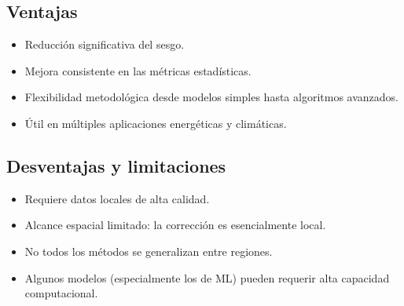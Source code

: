 \documentclass[letterpaper,12pt, twoside]{report}
\providecommand{\DIFdeltex}[1]{{\protect\color{red} \scriptsize #1}} %
\providecommand{\DIFdel}[1]{\texorpdfstring{\DIFdeltex{#1}}{}} %
\begin{document}
\subsection*{\DIFdel{Ventajas}}
\begin{itemize}%
\item%
\DIFdel{Reducción significativa del sesgo.
}%
\item%
\DIFdel{Mejora consistente en las métricas estadísticas.
}%
\item%
\DIFdel{Flexibilidad metodológica desde modelos simples hasta algoritmos avanzados.
}%
\item%
\DIFdel{Útil en múltiples aplicaciones energéticas y climáticas.
}
\end{itemize}%

\subsection*{\DIFdel{Desventajas y limitaciones}}

\begin{itemize}%
\item%
\DIFdel{Requiere datos locales de alta calidad.
}%
\item%
\DIFdel{Alcance espacial limitado: la corrección es esencialmente local.
}%
\item%
\DIFdel{No todos los métodos se generalizan entre regiones.
}%
\item%
\DIFdel{Algunos modelos (especialmente los de ML) pueden requerir alta capacidad computacional.
}
\end{itemize}%
\end{document}

